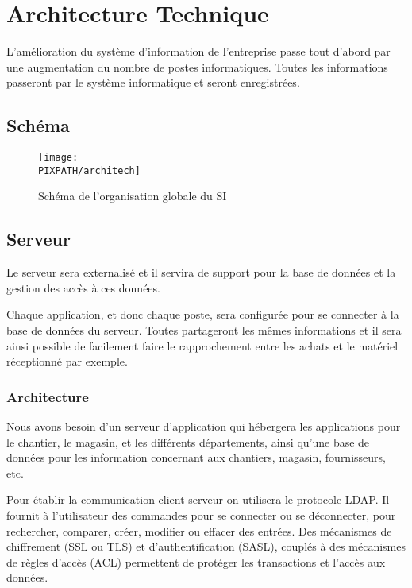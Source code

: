 \section{Architecture Technique}
L'amélioration du système d’information de l'entreprise passe tout d'abord
par une augmentation du nombre de postes informatiques. Toutes les
informations passeront par le système informatique et seront enregistrées.

\subsection{Schéma}

\begin{figure}[!h]
\begin{center}
\texttt{[image: \\PIXPATH/architech]}
\caption{Schéma de l'organisation globale du SI}
\end{center}
\end{figure}


\subsection{Serveur}

Le serveur sera externalisé et il servira de support pour la base de
données et la gestion des accès à ces données. 

Chaque application, et donc chaque poste, sera configurée pour se connecter
à la base de données du serveur.  Toutes partageront les mêmes informations
et il sera ainsi possible de facilement faire le rapprochement entre les
achats et le matériel réceptionné par exemple.

	\subsubsection{Architecture}
Nous avons besoin d'un serveur d'application qui hébergera les applications
pour le chantier, le magasin, et les différents départements,  ainsi qu'une
base de données pour les information concernant aux chantiers, magasin,
fournisseurs, etc. 

Pour établir la communication client-serveur on utilisera le protocole
LDAP. Il fournit à l'utilisateur des commandes pour se connecter ou se
déconnecter,  pour rechercher, comparer, créer, modifier ou effacer des
entrées.  Des mécanismes de chiffrement (SSL ou TLS) et d'authentification
(SASL), couplés à des mécanismes de règles d'accès (ACL) permettent de
protéger les transactions et l'accès aux données.


